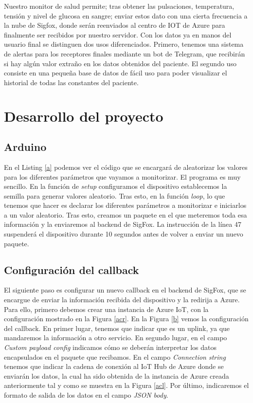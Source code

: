 \documentclass[12pt,a4paper]{article}
\begin{document}
Nuestro monitor de salud permite; tras obtener las pulsaciones, temperatura, tensión y nivel de glucosa en sangre; enviar estos dato con una cierta frecuencia a la nube de Sigfox, donde serán reenviados al centro de IOT de Azure para finalmente ser recibidos por nuestro servidor. Con los datos ya en manos del usuario final se distinguen dos usos diferenciados. Primero, tenemos una sistema de alertas para los receptores finales mediante un bot de Telegram, que recibirán si hay algún valor extraño en los datos obtenidos del paciente. El segundo uso consiste en una pequeña base de datos de fácil uso para poder visualizar el historial de todas las constantes del paciente.

\section{Desarrollo del proyecto}

\subsection{Arduino}

En el Listing \ref{a} podemos ver el código que se encargará de aleatorizar los valores para los diferentes parámetros que vayamos a monitorizar. El programa es muy sencillo. En la función de \textit{setup} configuramos el dispositivo establecemos la semilla para generar valores aleatorio. Tras esto, en la función \textit{loop}, lo que tenemos que hacer es declarar los diferentes parámetros a monitorizar e iniciarlos a un valor aleatorio. Tras esto, creamos un paquete en el que meteremos toda esa información y la enviaremos al backend de SigFox. La instrucción de la línea 47 suspenderá el dispositivo durante 10 segundos antes de volver a enviar un nuevo paquete.

\lstset{inputencoding=utf8/latin1}
\begin{minipage}{\linewidth} 
  
\end{minipage}

\subsection{Configuración del callback}

El siguiente paso es configurar un nuevo callback en el backend de SigFox, que se encargue de enviar la información recibida del dispositivo y la redirija a Azure. Para ello, primero debemos crear una instancia de Azure IoT, con la configuración mostrado en la Figura \ref{acr}. En la Figura \ref{b} vemos la configuración del callback. En primer lugar, tenemos que indicar que es un uplink, ya que mandaremos la información a otro servicio. En segundo lugar, en el campo \textit{Custom payload config} indicamos cómo se deberán interpretar los datos encapsulados en el paquete que recibamos. En el campo \textit{Connection string} tenemos que indicar la cadena de conexión al IoT Hub de Azure donde se enviarán los datos, la cual ha sido obtenida de la instancia de Azure creada anteriormente tal y como se muestra en la Figura \ref{acl}. Por último, indicaremos el formato de salida de los datos en el campo \textit{JSON body}.
\end{document}
